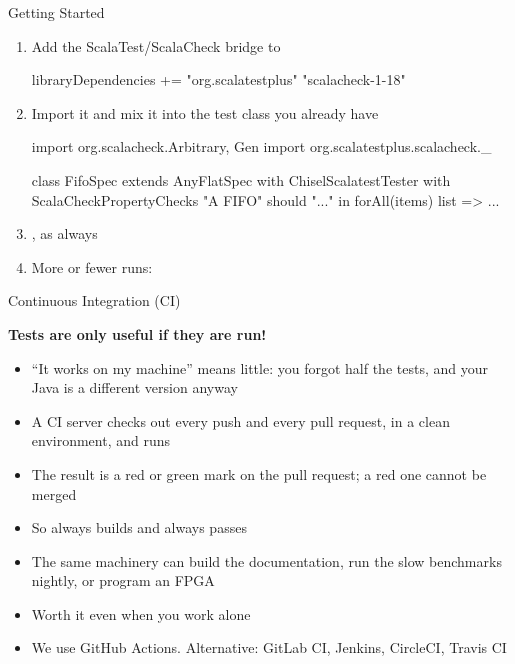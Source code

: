 \begin{frame}[fragile]{Getting Started}
	\begin{enumerate}
		\item Add the ScalaTest/ScalaCheck bridge to 
		\begin{chisel}[basicstyle=\scriptsize\ttfamily]
libraryDependencies += "org.scalatestplus" %
  "scalacheck-1-18" %
		\end{chisel}
		\item Import it and mix it into the test class you already have
		\begin{chisel}[basicstyle=\scriptsize\ttfamily]
import org.scalacheck.{Arbitrary, Gen}
import org.scalatestplus.scalacheck._

class FifoSpec extends AnyFlatSpec
    with ChiselScalatestTester
    with ScalaCheckPropertyChecks {
  "A FIFO" should "..." in {
    forAll(items) { list => ... }
  }
}
		\end{chisel}
		\item {}, as always
		\item More or fewer runs: 
	\end{enumerate}
\end{frame}

\begin{frame}{Continuous Integration (CI)}

	\textbf{Tests are only useful if they are run!}

	\vspace{1em}
	\begin{itemize}
		\item ``It works on my machine'' means little: you forgot half the tests, and your Java is a different version anyway
		\pause
		\item A CI server checks out every push and every pull request, in a clean environment, and runs 
		\item The result is a red or green mark on the pull request; a red one cannot be merged
		\item So  always builds and always passes
		\pause
		\item The same machinery can build the documentation, run the slow benchmarks nightly, or program an FPGA
		\item Worth it even when you work alone
		\item We use GitHub Actions. Alternative: GitLab CI, Jenkins, CircleCI, Travis CI
	\end{itemize}

\end{frame}

